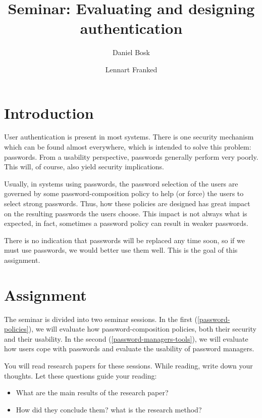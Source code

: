 \title{Seminar: Evaluating and designing authentication}

\author{%
  Daniel Bosk
  \and
  Lennart Franked
}

\maketitle

\begin{abstract}
  
\end{abstract}


\section{Introduction}%
\label{sec:intro}

User authentication is present in most systems.
There is one security mechanism which can be found almost everywhere, which is 
intended to solve this problem: passwords.
From a usability perspective, passwords generally perform very poorly.
This will, of course, also yield security implications.

Usually, in systems using passwords, the password selection of the users are 
governed by some password-composition policy to help (or force) the users to 
select strong passwords.
Thus, how these policies are designed has great impact on the resulting 
passwords the users choose.
This impact is not always what is expected, in fact, sometimes a password 
policy can result in weaker passwords.

There is no indication that passwords will be replaced any time soon, so if we 
must use passwords, we would better use them well.
This is the goal of this assignment.


\section{Assignment}%
\label{sec:tasks}

The seminar is divided into two seminar sessions.
In the first (\cref{password-policies}), we will evaluate how 
password-composition policies, both their security and their usability.
In the second (\cref{password-managers-tools}), we will evaluate how users cope 
with passwords and evaluate the usability of password managers.

You will read research papers for these sessions.
While reading, write down your thoughts.
Let these questions guide your reading:
\begin{itemize}
  \item What are the main results of the research paper?
  \item How did they conclude them?
    \Ie what is the research method?
\end{itemize}

